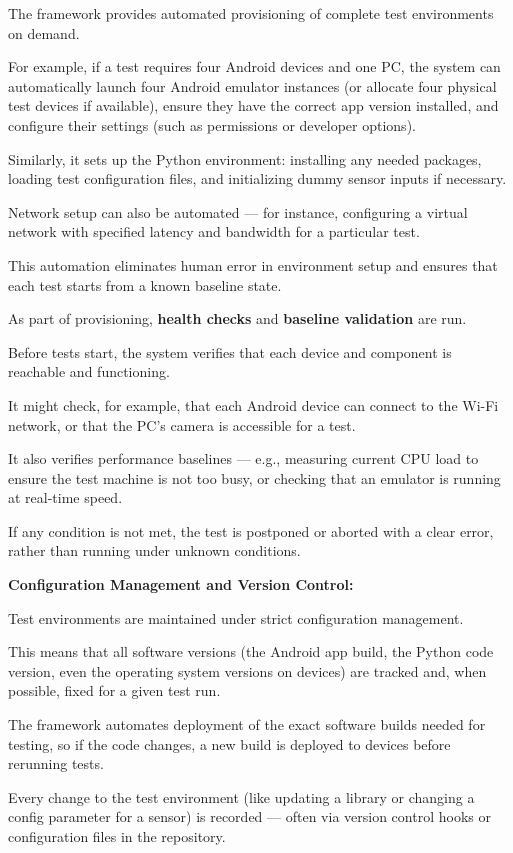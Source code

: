{{The framework provides automated provisioning of complete test environments on
demand.

For example, if a test requires four Android devices and one PC, the system can
automatically launch four Android emulator instances (or allocate four physical test
devices if available), ensure they have the correct app version installed, and
configure their settings (such as permissions or developer options).

Similarly, it sets up the Python environment: installing any needed packages, loading
test configuration files, and initializing dummy sensor inputs if necessary.

Network setup can also be automated --- for instance, configuring a virtual network
with specified latency and bandwidth for a particular test.

This automation eliminates human error in environment setup and ensures that each
test starts from a known baseline state.

As part of provisioning, \textbf{health checks}
 and \textbf{baseline validation}
 are run.

Before tests start, the system verifies that each device and component is reachable
and functioning.

It might check, for example, that each Android device can connect to the Wi-Fi
network, or that the PC's camera is accessible for a test.

It also verifies performance baselines --- e.g., measuring current CPU load to ensure
the test machine is not too busy, or checking that an emulator is running at
real-time speed.

If any condition is not met, the test is postponed or aborted with a clear error,
rather than running under unknown conditions.

\textbf{Configuration Management and Version Control:}

Test environments are maintained under strict configuration management.

This means that all software versions (the Android app build, the Python code
version, even the operating system versions on devices) are tracked and, when
possible, fixed for a given test run.

The framework automates deployment of the exact software builds needed for testing,
so if the code changes, a new build is deployed to devices before rerunning tests.

Every change to the test environment (like updating a library or changing a config
parameter for a sensor) is recorded --- often via version control hooks or
configuration files in the repository.

}}
